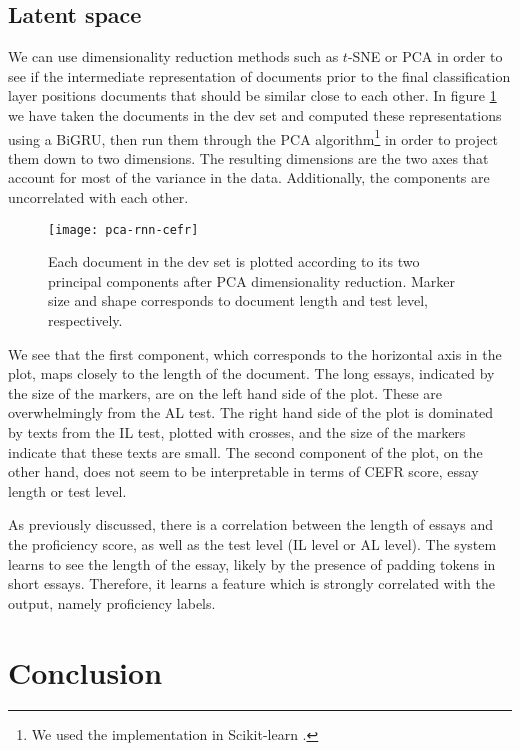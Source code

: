 \subsection{Latent space}

We can use dimensionality reduction methods such as $t$-SNE or \ac{PCA} in
order to see if the intermediate representation of documents prior to the
final classification layer positions documents that should be similar close
to each other. In figure \ref{fig:pca-rnn-cefr} we have taken the documents
in the dev set and computed these representations using a BiGRU, then run
them through the PCA algorithm\footnote{We used the implementation in
Scikit-learn \autocite{scikit-learn}.} in order to project them down to two
dimensions. The resulting dimensions are the two axes that account for most
of the variance in the data. Additionally, the components are uncorrelated
with each other.

\begin{figure}
  \centering
  \texttt{[image: pca-rnn-cefr]}
  \caption[PCA plot of the vector representations of documents]{
    Each document in the dev set is plotted according to its two principal
    components after PCA dimensionality reduction. Marker size and shape
    corresponds to document length and test level, respectively.
  }
  \label{fig:pca-rnn-cefr}
\end{figure}

We see that the first component, which corresponds to the horizontal axis in
the plot, maps closely to the length of the document. The long essays,
indicated by the size of the markers, are on the left hand side of the plot.
These are overwhelmingly from the AL test. The right hand side of the plot is
dominated by texts from the IL test, plotted with crosses, and the size of
the markers indicate that these texts are small. The second component of the
plot, on the other hand, does not seem to be interpretable in terms of CEFR
score, essay length or test level.

As previously discussed, there is a correlation between the length of essays
and the proficiency score, as well as the test level (IL level or AL level).
The system learns to see the length of the essay, likely by the presence of
padding tokens in short essays. Therefore, it learns a feature which is
strongly correlated with the output, namely proficiency labels.


\section{Conclusion}

